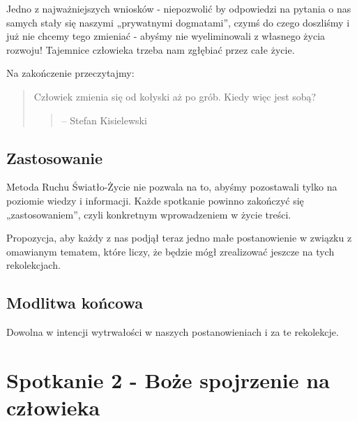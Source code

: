 \documentclass[a5paper,10pt,polish]{book}
\begin{document}
Jedno z najważniejszych wniosków - niepozwolić by odpowiedzi na pytania o nas samych stały się naszymi  „prywatnymi dogmatami”, czymś do czego doszliśmy i już nie chcemy tego zmieniać - abyśmy nie wyeliminowali z własnego życia rozwoju! Tajemnice człowieka trzeba nam zgłębiać przez całe życie.

Na zakończenie przeczytajmy:
\begin{quote}

Człowiek  zmienia się od kołyski  aż po grób. Kiedy więc jest sobą?
\begin{quote}

--  Stefan Kisielewski
\end{quote}
\end{quote}


\section{Zastosowanie}
\label{babice2006-wiosna-knurow/spotkanie1:zastosowanie}
Metoda Ruchu Światło-Życie nie pozwala na to, abyśmy pozostawali tylko na poziomie wiedzy  i informacji. Każde spotkanie  powinno zakończyć się
„zastosowaniem”, czyli konkretnym wprowadzeniem w życie treści.

Propozycja, aby każdy z nas  podjął  teraz jedno małe postanowienie w związku z omawianym tematem, które liczy, że będzie  mógł zrealizować jeszcze na tych rekolekcjach.


\section{Modlitwa końcowa}
\label{babice2006-wiosna-knurow/spotkanie1:modlitwa-koncowa}
Dowolna w intencji wytrwałości w naszych postanowieniach  i za te rekolekcje.


\chapter{Spotkanie 2 - Boże spojrzenie na człowieka}
\label{babice2006-wiosna-knurow/spotkanie2:spotkanie-2-boze-spojrzenie-na-czlowieka}\label{babice2006-wiosna-knurow/spotkanie2::doc}
\end{document}
